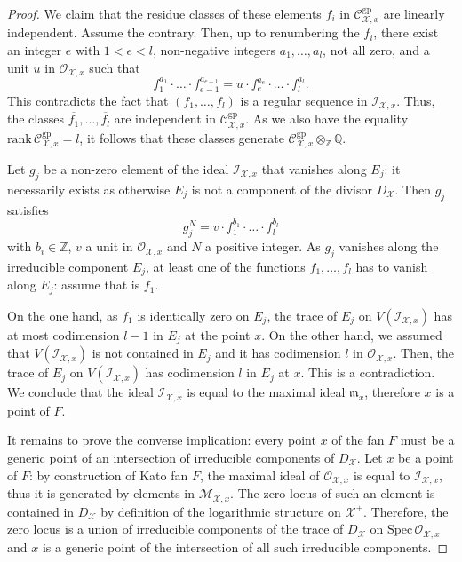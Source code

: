 \documentclass{amsart}%
\numberwithin{equation}{subsection}
\theoremstyle{plain2}
\theoremstyle{definition2}
\theoremstyle{stepstyle}
\theoremstyle{point}
\theoremstyle{subpoint}
\newcommand{\Z}{\ensuremath{\mathbb{Z}}}
\newcommand{\Q}{\ensuremath{\mathbb{Q}}}
\newcommand{\cX}{\ensuremath{\mathscr{X}}}
\newcommand{\caC}{\ensuremath{\mathcal{C}}}
\newcommand{\caO}{\ensuremath{\mathcal{O}}}
\newcommand{\caI}{\ensuremath{\mathcal{I}}}
\newcommand{\Spec}{\ensuremath{\mathrm{Spec}\,}}
\newcommand{\gp}{\mathrm{gp}}
\begin{document}
\begin{proof}
We claim that the residue classes of these elements $f_i$ in $\mathcal{C}_{\cX,x}^{\gp}$ are linearly independent. Assume the contrary. Then, up to renumbering the $f_i$, there exist an  integer $e$ with $1< e< l$, non-negative integers $a_1,\ldots,a_l$, not all zero, and a unit $u$ in $\mathcal{O}_{\cX,x}$ such that $$f_1^{a_1}\cdot \ldots \cdot f_{e-1}^{a_{e-1}}=u\cdot f_e^{a_e}\cdot \ldots \cdot f_l^{a_l}.$$ This contradicts the fact that $(f_1,\ldots,f_l)$ is a regular sequence in $\mathcal{I}_{\cX,x}$. Thus, the classes $\overline{f_1}, \ldots,\overline{f_l}$ are independent in $\caC_{\cX,x}^\gp$. As we also have the equality $\mathrm{rank}\,\mathcal{C}^{\gp}_{\cX,x}=l$, it follows that these classes generate $\caC_{\cX,x}^\gp \otimes_{\Z} \Q$.

Let $g_j$ be a non-zero element of the ideal $\caI_{\cX,x}$ that vanishes along $E_j$: it necessarily exists as otherwise $E_j$ is not a component of the divisor $D_{\cX}$. Then $g_j$ satisfies $$g_{j}^N = v \cdot f_1^{b_1} \cdot \ldots \cdot f_l^{b_l}$$ with $b_i \in \Z$, $v$ a unit in $\caO_{\cX,x}$ and $N$ a positive integer. As $g_j$ vanishes along the irreducible component $E_j$, at least one of the functions $f_1,\ldots,f_l$ has to vanish along $E_j$: assume that is $f_1$.

On the one hand, as $f_1$ is identically zero on $E_j$, the trace of $E_j$ on $V(\caI_{\cX,x})$ has at most codimension $l-1$ in $E_j$ at the point $x$. On the other hand, we assumed that $V(\caI_{\cX,x})$ is not contained in $E_j$ and it has codimension $l$ in $\caO_{\cX,x}$. Then, the trace of $E_j$ on $V(\caI_{\cX,x})$ has codimension $l$ in $E_j$ at $x$. This is a contradiction. We conclude that the ideal $\caI_{\cX,x}$ is equal to the maximal ideal $\mathfrak{m}_x$, therefore $x$ is a point of $F$.

It remains to prove the converse implication: every point $x$ of the fan $F$ must be a generic point of an intersection of irreducible components of $D_{\cX}$. Let $x$ be a point of $F$: by construction of Kato fan $F$, the maximal ideal of $\mathcal{O}_{\cX,x}$ is equal to $\mathcal{I}_{\cX,x}$, thus it is generated by elements in $\mathcal{M}_{\cX,x}$. The zero locus of such an element is contained in $D_{\cX}$ by definition of the logarithmic structure on $\cX^+$. Therefore, the zero locus is a union of irreducible components of the trace of $D_{\cX}$ on $\Spec \mathcal{O}_{\cX,x}$ and $x$ is a generic point of the intersection of all such irreducible components.
\end{proof}
\end{document}
